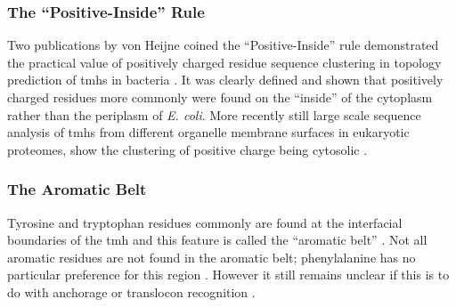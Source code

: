 \subsubsection{The ``Positive-Inside'' Rule}

Two publications by von Heijne coined the ``Positive-Inside'' rule demonstrated the practical value of positively charged residue sequence clustering in topology prediction of \gls{tmh}s in bacteria \cite{VonHeijne1989,VonHeijne1992}. It was clearly defined and shown that positively charged residues more commonly were found on the ``inside'' of the cytoplasm rather than the periplasm of {\it E. coli}. More recently still large scale sequence analysis of \gls{tmh}s from different organelle membrane surfaces in eukaryotic proteomes, show the clustering of positive charge being cytosolic \cite{Sharpe2010, Baeza-Delgado2013, Pogozheva2013}.

\subsubsection{The Aromatic Belt}

 Tyrosine and tryptophan residues commonly are found at the interfacial boundaries of the \gls{tmh} and this feature is called the ``aromatic belt'' \cite{Hessa2005, Granseth2005, Sharpe2010, Baeza-Delgado2013, Nilsson2005}. Not all aromatic residues are not found in the aromatic belt; phenylalanine has no particular preference for this region \cite{Granseth2005, Braun1999}. However it still remains unclear if this is to do with anchorage or translocon recognition \cite{Baeza-Delgado2013}.


